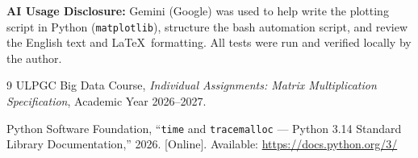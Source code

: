 \documentclass[11pt,a4paper]{article}
\begin{document}
\smallskip\noindent
\textbf{AI Usage Disclosure:} Gemini (Google) was used to help write the plotting script in Python (\texttt{matplotlib}), structure the bash automation script, and review the English text and \LaTeX\ formatting. All tests were run and verified locally by the author.

\begin{thebibliography}{9}
ULPGC Big Data Course, \emph{Individual Assignments: Matrix Multiplication Specification}, Academic Year 2026--2027.

Python Software Foundation, ``\texttt{time} and \texttt{tracemalloc} --- Python 3.14 Standard Library Documentation,'' 2026. [Online]. Available: \url{https://docs.python.org/3/}
\end{thebibliography}
\end{document}
